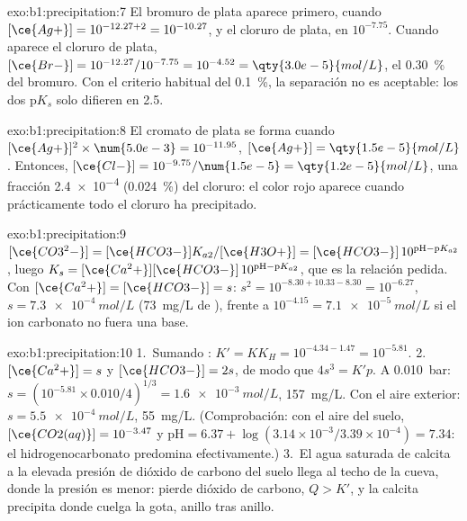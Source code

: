 \begin{solution}{exo:b1:precipitation:7}
El bromuro de plata aparece primero, cuando $[\ce{Ag+}] = 10^{-12.27 + 2} =
10^{-10.27}$, y el cloruro de plata, en $10^{-7.75}$. Cuando aparece el
cloruro de plata, $[\ce{Br-}] = 10^{-12.27}/10^{-7.75} = 10^{-4.52} =
\qty{3.0e-5}{mol/L}$, el \qty{0.30}{\percent} del bromuro. Con el criterio
habitual del \qty{0.1}{\percent}, la separación no es aceptable: los dos
$\mathrm{p}K_s$ solo difieren en 2.5.
\end{solution}

\begin{solution}{exo:b1:precipitation:8}
El cromato de plata se forma cuando $[\ce{Ag+}]^2 \times \num{5.0e-3} = 10^{-11.95}$,
$[\ce{Ag+}] = \qty{1.5e-5}{mol/L}$. Entonces, $[\ce{Cl-}] = 10^{-9.75}/\num{1.5e-5}
= \qty{1.2e-5}{mol/L}$, una fracción \num{2.4e-4} (\qty{0.024}{\percent})
del cloruro: el color rojo aparece cuando prácticamente todo el cloruro
ha precipitado.
\end{solution}

\begin{solution}{exo:b1:precipitation:9}
$[\ce{CO3^2-}] = [\ce{HCO3-}]K_{a2}/[\ce{H3O+}] = [\ce{HCO3-}]\,10^{\mathrm{pH}
- \mathrm{p}K_{a2}}$, luego $K_s = [\ce{Ca^2+}][\ce{HCO3-}]\,10^{\mathrm{pH} -
\mathrm{p}K_{a2}}$, que es la relación pedida. Con $[\ce{Ca^2+}] =
[\ce{HCO3-}] = s$: $s^2 = 10^{-8.30 + 10.33 - 8.30} = 10^{-6.27}$,
$s = \qty{7.3e-4}{mol/L}$ (\qty{73}{mg/L} de ), frente a
$10^{-4.15} = \qty{7.1e-5}{mol/L}$ si el ion carbonato no fuera una base.
\end{solution}

\begin{solution}{exo:b1:precipitation:10}
1.~Sumando : $K' = K K_H = 10^{-4.34 - 1.47} =
10^{-5.81}$.
2.~$[\ce{Ca^2+}] = s$ y $[\ce{HCO3-}] = 2s$, de modo que $4s^3 = K'p$. A
\qty{0.010}{bar}: $s = (10^{-5.81} \times 0.010/4)^{1/3} =
\qty{1.6e-3}{mol/L}$, \qty{157}{mg/L}. Con el aire exterior:
$s = \qty{5.5e-4}{mol/L}$, \qty{55}{mg/L}. (Comprobación: con el aire del
suelo, $[\ce{CO2(aq)}] = 10^{-3.47}$ y $\mathrm{pH} = 6.37 + \log(3.14\times
10^{-3}/3.39 \times 10^{-4}) = 7.34$: el hidrogenocarbonato predomina
efectivamente.)
3.~El agua saturada de calcita a la elevada presión de dióxido de carbono
del suelo llega al techo de la cueva, donde la presión es menor: pierde
dióxido de carbono, $Q > K'$, y la calcita precipita donde cuelga la
gota, anillo tras anillo.
\end{solution}

